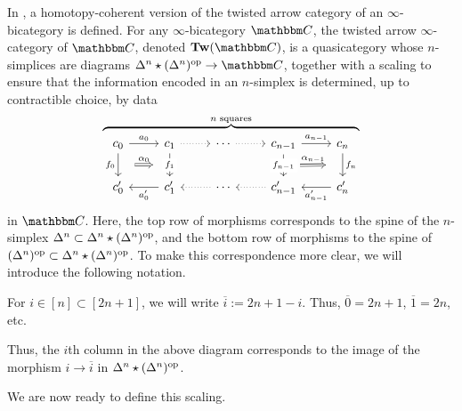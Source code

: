 \documentclass[main.tex]{subfiles}
\begin{document}
In \cite{garcia2020enhanced}, a homotopy-coherent version of the twisted arrow category of an $\infty$-bicategory is defined. For any $\infty$-bicategory $\CC$, the twisted arrow $\infty$-category of $\CC$, denoted $\Tw(\CC)$, is a quasicategory whose $n$-simplices are diagrams $\Delta^{n} \star (\Delta^{n})\op \to \CC$, together with a scaling to ensure that the information encoded in an $n$-simplex is determined, up to contractible choice, by data
\begin{equation*}
  \overbrace{
    \begin{tikzcd}[ampersand replacement=\&]
      c_{0}
      \arrow[r, "a_{0}"]
      \arrow[d, "f_{0}"{swap}, ""{name=L1}]
      \& c_{1}
      \arrow[d, "f_{1}"{description}, ""{swap, name=R1}]
      \arrow[r, dotted]
      \& \cdots
      \arrow[r, dotted]
      \& c_{n-1}
      \arrow[r, "a_{n-1}"]
      \arrow[d, "f_{n-1}"{description}, ""{name=Ln}]
      \& c_{n}
      \arrow[d, "f_{n}", ""{swap, name=Rn}]
      \\
      c'_{0}
      \& c'_{1}
      \arrow[l, "a'_{0}"]
      \& \cdots
      \arrow[l, dotted]
      \& c'_{n-1}
      \arrow[l, dotted]
      \& c'_{n}
      \arrow[l, "a'_{n-1}"]
      \arrow[from=L1, to=R1, Rightarrow, "\alpha_{0}", shorten=2ex]
      \arrow[from=Ln, to=Rn, Rightarrow, "\alpha_{n-1}", shorten=2ex]
    \end{tikzcd}
  }^{n\text{ squares}}
\end{equation*}
in $\CC$. Here, the top row of morphisms corresponds to the spine of the $n$-simplex $\Delta^{n} \subset \Delta^{n} \star (\Delta^{n})^{\mathrm{op}}$, and the bottom row of morphisms to the spine of $(\Delta^{n})^{\mathrm{op}} \subset \Delta^{n} \star (\Delta^{n})^{\mathrm{op}}$. To make this correspondence more clear, we will introduce the following notation.

\begin{notation}
  For $i \in [n] \subset [2n+1]$, we will write $\overline{i} := 2n+1-i$. Thus, $\overline{0} = 2n+1$, $\overline{1} = 2n$, etc.
\end{notation}

Thus, the $i$th column in the above diagram corresponds to the image of the morphism $i \to \overline{i}$ in $\Delta^{n} \star (\Delta^{n})^{\mathrm{op}}$.

We are now ready to define this scaling.
\end{document}
